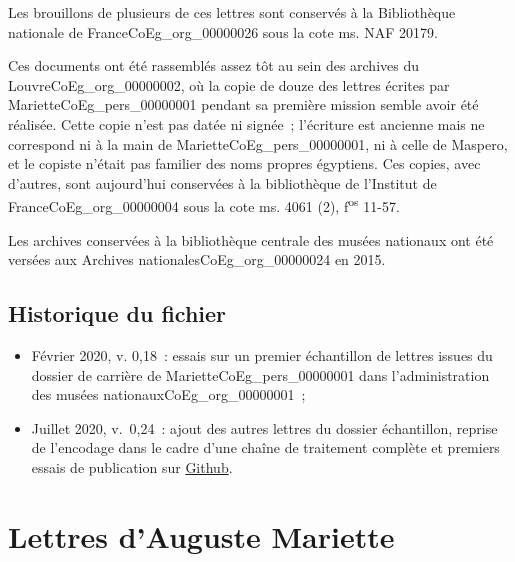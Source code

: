 \documentclass{book}
\begin{document}
\par Les brouillons de plusieurs de ces lettres sont conservés à la Bibliothèque nationale de France\gls{CoEg_org_00000026} sous la cote ms. NAF 20179.
\par Ces documents ont été rassemblés assez tôt au sein des archives du Louvre\gls{CoEg_org_00000002}, où la copie de douze des lettres écrites par Mariette\gls{CoEg_pers_00000001} pendant sa première mission semble avoir été réalisée. Cette copie n'est pas datée ni signée~; l’écriture est ancienne mais ne correspond ni à la main de Mariette\gls{CoEg_pers_00000001}, ni à celle de Maspero, et le copiste n’était pas familier des noms propres égyptiens. Ces copies, avec d’autres, sont aujourd’hui conservées à la bibliothèque de l’Institut de France\gls{CoEg_org_00000004} sous la cote ms. 4061 (2), f\textsuperscript{os} 11-57.
\par Les archives conservées à la bibliothèque centrale des musées nationaux ont été versées aux Archives nationales\gls{CoEg_org_00000024} en 2015.

\section*{Historique du fichier}
\begin{itemize}
\item Février 2020, v. 0,18~: essais sur un premier échantillon de lettres issues du dossier de carrière de Mariette\gls{CoEg_pers_00000001} dans l’administration des musées nationaux\gls{CoEg_org_00000001}~;
\item Juillet 2020, v.~0,24~: ajout des autres lettres du dossier échantillon, reprise de l’encodage dans le cadre d’une chaîne de traitement complète et premiers essais de publication sur \href{https://thlebee.github.io/CoEg/}{Github}.
\end{itemize}

\mainmatter

\chapter*{Lettres d’Auguste Mariette}

\hypertarget{CoEg_Mariette_1849-10-20}{}
\end{document}

